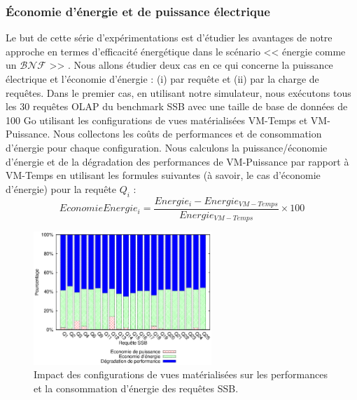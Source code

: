 \subsubsection{Économie d'énergie et de puissance électrique}\label{subsubsec:PowerEnergySaving}
Le but de cette série d'expérimentations est d'étudier les avantages de notre approche en termes d'efficacité énergétique dans le scénario << énergie comme un $\mathcal{BNF}$ >> . Nous allons étudier deux cas en ce qui concerne la puissance électrique et l'économie d'énergie : (i) par requête et (ii) par la charge de requêtes. Dans le premier cas, en utilisant notre simulateur, nous exécutons tous les 30 requêtes OLAP du benchmark SSB avec une taille de base de données de 100 Go utilisant les configurations de vues matérialisées VM-Temps et VM-Puissance. Nous collectons les coûts de performances et de consommation d'énergie pour chaque configuration. Nous calculons la puissance/économie d'énergie et de la dégradation des performances de VM-Puissance par rapport à VM-Temps en utilisant les formules suivantes (à savoir, le cas d'économie d'énergie) pour la requête $Q_i$ :
\begin{equation}\label{eq:power-saving}
 EconomieEnergie_i = \frac{Energie_i - Energie_{VM-Temps}}{Energie_{VM-Temps}} \times 100
\end{equation}

\begin{figure}
  \centering
  \includegraphics[width=0.6\textwidth]{chapitre6/chap6Fig/ssb-mv-conf.eps}
  \caption{Impact des configurations de vues matérialisées sur les performances et la consommation d'énergie des requêtes SSB.}\label{fig:ssb-mv-conf}
\end{figure}


